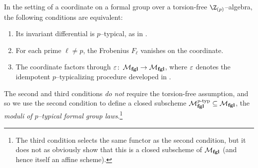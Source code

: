 \begin{definition}
In the setting of a coordinate on a formal group over a torsion-free \(\Z_{(p)}\)--algebra, the following conditions are equivalent:
\begin{enumerate}
\item Its invariant differential is \(p\)--typical, as in .
\item For each prime \(\ell \ne p\), the Frobenius \(F_\ell\) vanishes on the coordinate.
\item The coordinate factors through \(\varepsilon\colon\thinspace \mathcal{M}_{\mathbf{fgl}} \to \mathcal{M}_{\mathbf{fgl}}\), where \(\varepsilon\) denotes the idempotent \(p\)--typicalizing procedure developed in .
\end{enumerate}
The second and third conditions \emph{do not} require the torsion-free assumption, and so we use the second condition to define a closed subscheme \(\mathcal{M}_{\mathbf{fgl}}^{\mathit{p}\text{-}\mathrm{typ}} \subseteq \mathcal{M}_{\mathbf{fgl}}\), the \textit{moduli of \(p\)--typical formal group laws}.\footnote{The third condition selects the same functor as the second condition, but it does not as obviously show that this is a closed subscheme of $\mathcal{M}_{\mathbf{fgl}}$ (and hence itself an affine scheme).}
\end{definition}

